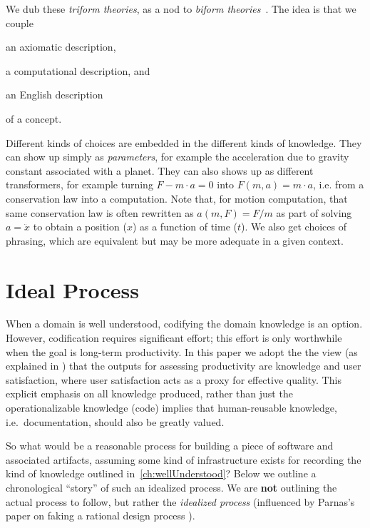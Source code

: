 \documentclass[sigconf,review]{acmart}
\begin{document}
We dub these \emph{triform theories}, as a nod to \emph{biform
theories}~\cite{Farmer2007}. The idea is that we couple 
\begin{enumerate*}
\item an axiomatic description,
\item a computational description, and
\item an English description
\end{enumerate*}
of a concept.

Different kinds of choices are embedded in the different kinds of knowledge.
They can show up simply as \emph{parameters}, for example the acceleration due
to gravity constant associated with a planet. They can also shows up as
different transformers, for example turning $F - m\cdot a = 0$ into $F\left(m,
a\right) = m\cdot a$, i.e. from a conservation law into a computation. Note
that, for motion computation, that same conservation law is often rewritten as
$a\left(m,F\right) = F/m$ as part of solving $a = \ddot{x}$ to obtain a position
($x$) as a function of time ($t$). We also get choices of phrasing, which are
equivalent but may be more adequate in a given context.

\section{Ideal Process}\label{ch:process}

When a domain is well understood, codifying the domain knowledge is an option.
However, codification requires significant effort; this effort is only
worthwhile when the goal is long-term productivity.  In this paper we adopt the
the view (as explained in \cite{SmithAndCarette2020arXiv}) that the outputs for
assessing productivity are knowledge and user satisfaction, where user
satisfaction acts as a proxy for effective quality. This explicit emphasis on
all knowledge produced, rather than just the operationalizable knowledge (code)
implies that human-reusable knowledge, i.e.\ documentation, should also be
greatly valued.

So what would be a reasonable process for building a piece of software and
associated artifacts, assuming some kind of infrastructure exists for recording
the kind of knowledge outlined in~\autoref{ch:wellUnderstood}?  Below we outline
a chronological ``story'' of such an idealized process.  We are \textbf{not}
outlining the actual process to follow, but rather the \emph{idealized process}
(influenced by Parnas's paper on faking a rational design process
\cite{Parnas1986}).
\end{document}
